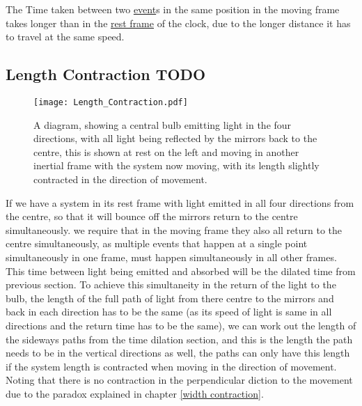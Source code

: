 The Time taken between two \hyperlink{def-event}{event}s in the same position in the moving frame takes longer than in the \hyperlink{def-proper-frame}{rest frame} of the clock, due to the longer distance it has to travel at the same speed.

\subsection{Length Contraction TODO}

\begin{figure}[H]
\centering
\texttt{[image: Length\_Contraction.pdf]}
    \caption{A diagram, showing a central bulb emitting light in the four directions, with all light being reflected by the mirrors back to the centre, this is shown at rest on the left and moving in another inertial frame with the system now moving, with its length slightly contracted in the direction of movement.}
    \label{fig: length contraction math}
\end{figure}

If we have a system in its rest frame with light emitted in all four directions from the centre, so that it will bounce off the mirrors return to the centre simultaneously. we require that in the moving frame they also all return to the centre simultaneously, as multiple events that happen at a single point simultaneously in one frame, must happen simultaneously in all other frames. This time between light being emitted and absorbed will be the dilated time from previous section. To achieve this simultaneity in the return of the light to the bulb, the length of the full path of light from there centre to the mirrors and back in each direction has to be the same (as its speed of light is same in all directions and the return time has to be the same), we can work out the length of the sideways paths from the time dilation section, and this is the length the path needs to be in the vertical directions as well, the paths can only have this length if the system length is contracted when moving in the direction of movement. Noting that there is no contraction in the perpendicular diction to the movement due to the paradox explained in chapter \ref{width contraction}.

